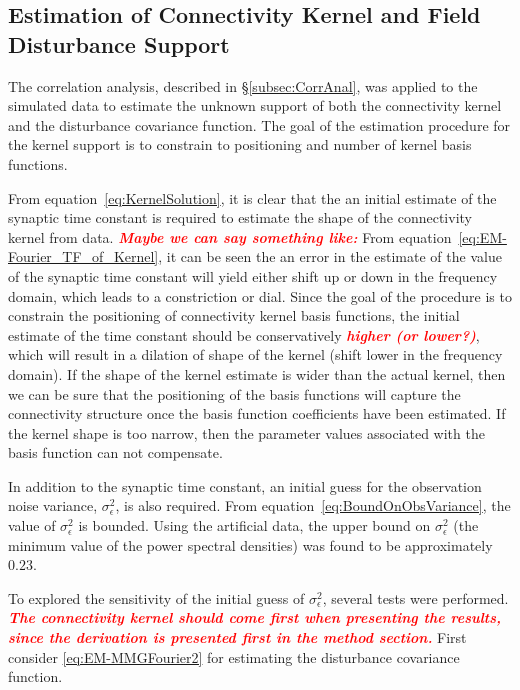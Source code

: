 \documentclass[]{article}
\newcommand{\dean}[1]{\textsf{\emph{\textbf{\textcolor{red}{#1}}}}}
\begin{document}
\subsection{Estimation of Connectivity Kernel and Field Disturbance Support }
The correlation analysis, described in \S\ref{subsec:CorrAnal}, was applied to the simulated data to estimate the unknown support of both the connectivity kernel and the disturbance covariance function. The goal of the estimation procedure for the kernel support is to constrain to positioning and number of kernel basis functions. 

From equation~\ref{eq:KernelSolution}, it is clear that the an initial estimate of the synaptic time constant is required to estimate the shape of the connectivity kernel from data. \dean{Maybe we can say something like:} From equation~\ref{eq:EM-Fourier_TF_of_Kernel}, it can be seen the an error in the estimate of the value of the synaptic time constant will yield either shift up or down in the frequency domain, which leads to a constriction or dial. Since the goal of the procedure is to constrain the positioning of connectivity kernel basis functions, the initial estimate of the time constant should be conservatively \dean{higher (or lower?)}, which will result in a dilation of shape of the kernel (shift lower in the frequency domain). If the shape of the kernel estimate is wider than the actual kernel, then we can be sure that the positioning of the basis functions will capture the connectivity structure once the basis function coefficients have been estimated. If the kernel shape is too narrow, then the parameter values associated with the basis function can not compensate. 

In addition to the synaptic time constant, an initial guess for the observation noise variance, $\sigma_{\epsilon}^2$, is also required. From equation~\eqref{eq:BoundOnObsVariance}, the value of $\sigma_{\epsilon}^2$ is bounded. Using the artificial data, the upper bound on $\sigma_{\epsilon}^2$ (the minimum value of the power spectral densities) was found to be approximately $0.23$.

To explored the sensitivity of the initial guess of $\sigma_{\epsilon}^2$, several tests were performed. \dean{The connectivity kernel should come first when presenting the results, since the derivation is presented first in the method section.} First consider \eqref{eq:EM-MMGFourier2} for estimating the disturbance covariance function.  
\end{document}
